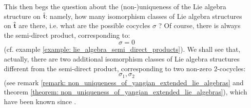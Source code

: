         This then begs the question about the (non-)uniqueness of the Lie algebra structure on $\hat{\mathfrak{t}}$: namely, how many isomorphism classes of Lie algebra structures on $\hat{\mathfrak{t}}$ are there, i.e. what are the possible cocycles $\sigma$ ? Of course, there is always the semi-direct product, corresponding to:
            $$\sigma = 0$$
        (cf. example \ref{example: lie_algebra_semi_direct_products}). We shall see that, actually, there are two additional isomorphism classes of Lie algebra structures different from the semi-direct product, corresponding to two non-zero $2$-cocycles:
            $$\sigma_1, \sigma_2$$
        (see remark \ref{remark: non_uniqueness_of_yangian_extended_lie_algebras} and theorem \ref{theorem: non_uniqueness_of_yangian_extended_lie_algebras}), which have been known since \cite{billig_energy_momentum_tensor}. 
        

